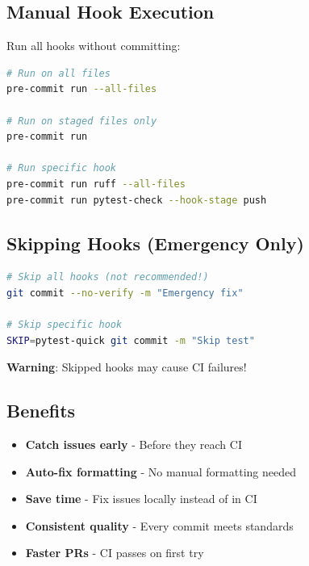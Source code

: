\subsection{Manual Hook Execution}\label{cr:app:archive-quickstart-precommit:manual-hook-execution}

\begin{record}

Run all hooks without committing:

\begin{lstlisting}[language=bash]
# Run on all files
pre-commit run --all-files

# Run on staged files only
pre-commit run

# Run specific hook
pre-commit run ruff --all-files
pre-commit run pytest-check --hook-stage push
\end{lstlisting}

\end{record}

\subsection{Skipping Hooks (Emergency Only)}\label{cr:app:archive-quickstart-precommit:skipping-hooks-emergency-only}

\begin{record}

\begin{lstlisting}[language=bash]
# Skip all hooks (not recommended!)
git commit --no-verify -m "Emergency fix"

# Skip specific hook
SKIP=pytest-quick git commit -m "Skip test"
\end{lstlisting}

\warn{} \textbf{Warning}: Skipped hooks may cause CI failures!

\end{record}

\subsection{Benefits}\label{cr:app:archive-quickstart-precommit:benefits}

\begin{record}

\begin{itemize}
\tightlist
\item
  \ok{} \textbf{Catch issues early} - Before they reach CI
\item
  \ok{} \textbf{Auto-fix formatting} - No manual formatting needed
\item
  \ok{} \textbf{Save time} - Fix issues locally instead of in CI
\item
  \ok{} \textbf{Consistent quality} - Every commit meets standards
\item
  \ok{} \textbf{Faster PRs} - CI passes on first try
\end{itemize}

\end{record}

